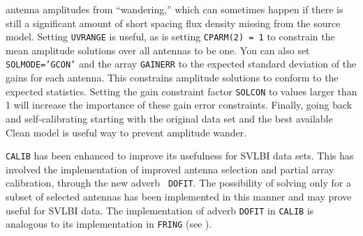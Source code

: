     antenna amplitudes from ``wandering,'' which can sometimes happen
    if there is still a significant amount of short spacing flux
    density missing from the source model.  Setting {\tt UVRANGE} is
    useful, as is setting {\tt CPARM(2) = 1} to constrain the mean
    amplitude solutions over all antennas to be one.  You can also set
    {\tt SOLMODE='GCON'} and the array {\tt GAINERR} to the expected
    standard deviation of the gains for each antenna.  This constrains
    amplitude solutions to conform to the expected statistics.
    Setting the gain constraint factor {\tt SOLCON} to values larger
    than 1 will increase the importance of these gain error
    constraints.  Finally, going back and self-calibrating starting
    with the original data set and the best available Clean model is
    useful way to prevent amplitude wander.
\xeen
{}

{\tt CALIB} has been enhanced to improve its usefulness for SVLBI
data sets. This has involved the implementation of improved antenna
selection and partial array calibration, through the new adverb {\tt
DOFIT}\@.  The possibility of solving only for a subset of selected
antennas has been implemented in this manner and may prove useful for
SVLBI data. The implementation of adverb {\tt DOFIT} in {\tt CALIB} is
analogous to its implementation in {\tt FRING} (see ).


